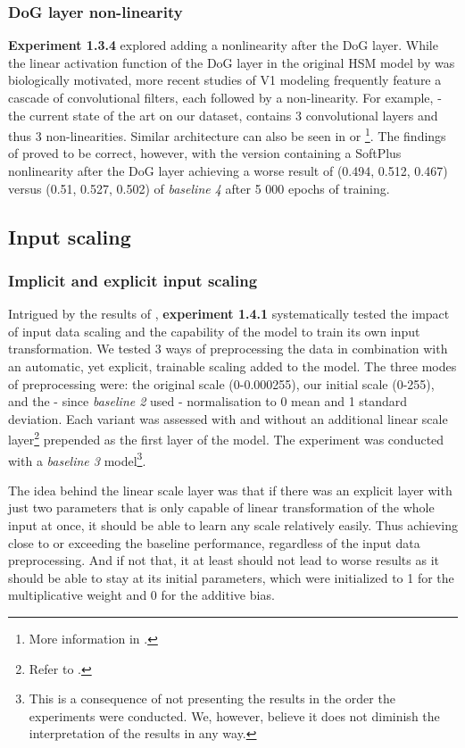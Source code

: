 \subsubsection{DoG layer non-linearity}\label{ex:1.3.4}

\textbf{Experiment 1.3.4} explored adding a nonlinearity after the DoG layer. While the linear activation function of the DoG layer in the original HSM model by \cite{antolik} was biologically motivated, more recent studies of V1 modeling frequently feature a cascade of convolutional filters, each followed by a non-linearity. For example, \cite{klindt} - the current state of the art on our dataset, contains 3 convolutional layers and thus 3 non-linearities. Similar architecture can also be seen in \cite{ecker} or \cite{Walke506956}\footnote{More information in .}. The findings of \citeauthor{antolik} proved to be correct, however, with the version containing a SoftPlus nonlinearity after the DoG layer achieving a worse result of (0.494, 0.512, 0.467) versus (0.51, 0.527, 0.502) of \textit{baseline 4} after 5 000 epochs of training.

\subsection{Input scaling}
\subsubsection{Implicit and explicit input scaling}

Intrigued by the results of , \textbf{experiment 1.4.1} systematically tested the impact of input data scaling and the capability of the model to train its own input transformation. We tested 3 ways of preprocessing the data in combination with an automatic, yet explicit, trainable scaling added to the model. The three modes of preprocessing were: the original scale (0-0.000255), our initial scale (0-255), and the - since \textit{baseline 2} used - normalisation to 0 mean and 1 standard deviation. Each variant was assessed with and without an additional linear scale layer\footnote{Refer to .} prepended as the first layer of the model. The experiment was conducted with a \textit{baseline 3} model\footnote{This is a consequence of not presenting the results in the order the experiments were conducted. We, however, believe it does not diminish the interpretation of the results in any way.}.

The idea behind the linear scale layer was that if there was an explicit layer with just two parameters that is only capable of linear transformation of the whole input at once, it should be able to learn any scale relatively easily. Thus achieving close to or exceeding the baseline performance, regardless of the input data preprocessing. And if not that, it at least should not lead to worse results as it should be able to stay at its initial parameters, which were initialized to 1 for the multiplicative weight and 0 for the additive bias.


